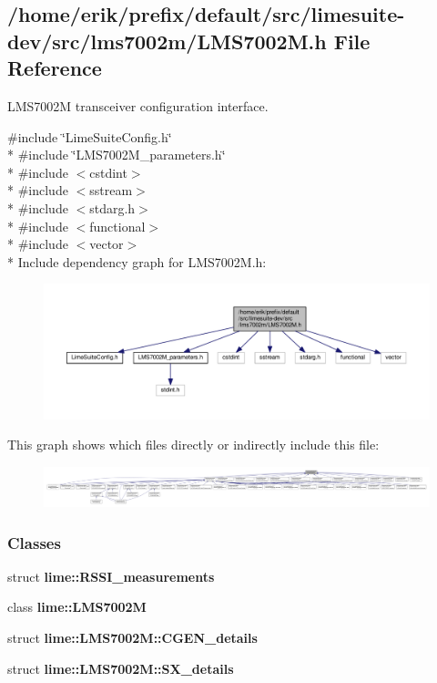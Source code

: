 \subsection{/home/erik/prefix/default/src/limesuite-\/dev/src/lms7002m/\+L\+M\+S7002M.h File Reference}
\label{LMS7002M_8h}


L\+M\+S7002M transceiver configuration interface.  


{\ttfamily \#include \char`\"{}Lime\+Suite\+Config.\+h\char`\"{}}\\*
{\ttfamily \#include \char`\"{}L\+M\+S7002\+M\+\_\+parameters.\+h\char`\"{}}\\*
{\ttfamily \#include $<$cstdint$>$}\\*
{\ttfamily \#include $<$sstream$>$}\\*
{\ttfamily \#include $<$stdarg.\+h$>$}\\*
{\ttfamily \#include $<$functional$>$}\\*
{\ttfamily \#include $<$vector$>$}\\*
Include dependency graph for L\+M\+S7002\+M.\+h\+:
\nopagebreak
\begin{figure}[H]
\begin{center}
\leavevmode
\includegraphics[width=350pt]{d6/d82/LMS7002M_8h__incl}
\end{center}
\end{figure}
This graph shows which files directly or indirectly include this file\+:
\nopagebreak
\begin{figure}[H]
\begin{center}
\leavevmode
\includegraphics[width=350pt]{d7/dad/LMS7002M_8h__dep__incl}
\end{center}
\end{figure}
\subsubsection*{Classes}
\begin{DoxyCompactItemize}
\item 
struct {\bf lime\+::\+R\+S\+S\+I\+\_\+measurements}
\item 
class {\bf lime\+::\+L\+M\+S7002M}
\item 
struct {\bf lime\+::\+L\+M\+S7002\+M\+::\+C\+G\+E\+N\+\_\+details}
\item 
struct {\bf lime\+::\+L\+M\+S7002\+M\+::\+S\+X\+\_\+details}
\end{DoxyCompactItemize}
